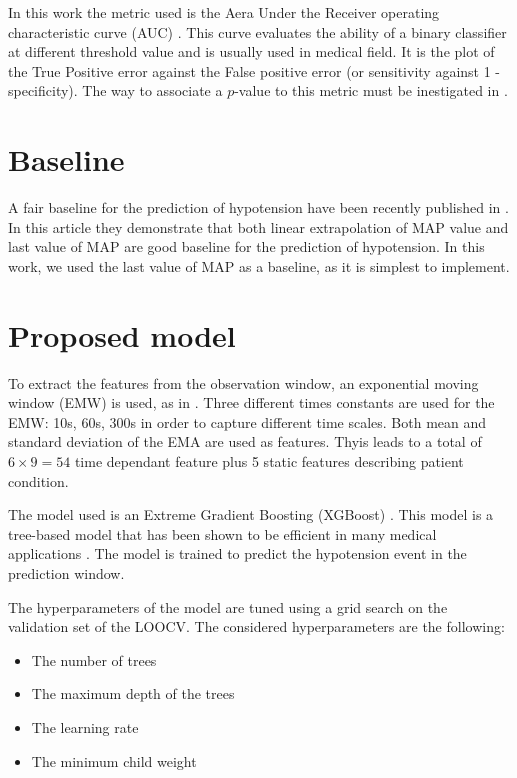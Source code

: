 \documentclass[a4paper,12pt]{article}
\begin{document}
In this work the metric used is the Aera Under the Receiver operating characteristic curve (AUC) \cite{masonAreasRelativeOperating2002a}. This curve evaluates the ability of a binary classifier at different threshold value and is usually used in medical field. It is the plot of the True Positive error against the False positive error (or sensitivity against 1 - specificity). The way to associate a $p$-value to this metric must be inestigated in \cite{masonAreasRelativeOperating2002a}.

\section{Baseline}

A fair baseline for the prediction of hypotension have been recently published in \cite{jacquet-lagrezePredictionIntraoperativeHypotension2022}. In this article they demonstrate that both linear extrapolation of MAP value and last value of MAP are good baseline for the prediction of hypotension. In this work, we used the last value of MAP as a baseline, as it is simplest to implement. \medskip


\section{Proposed model}

To extract the features from the observation window, an exponential moving window (EMW) is used, as in \cite{lundbergExplainableMachinelearningPredictions2018}. Three different times constants are used for the EMW: 10s, 60s, 300s in order to capture different time scales. Both mean and standard deviation of the EMA are used as features. Thyis leads to a total of $6 \times 9 = 54$ time dependant feature plus 5 static features describing patient condition. \medskip

The model used is an Extreme Gradient Boosting (XGBoost) \cite{chenXGBoostScalableTree2016}. This model is a tree-based model that has been shown to be efficient in many medical applications \cite{chenXGBoostScalableTree2016}. The model is trained to predict the hypotension event in the prediction window. \medskip

The hyperparameters of the model are tuned using a grid search on the validation set of the LOOCV. The considered hyperparameters are the following:
\begin{itemize}
    \item The number of trees
    \item The maximum depth of the trees
    \item The learning rate
    \item The minimum child weight
\end{itemize}





 
\end{document}
